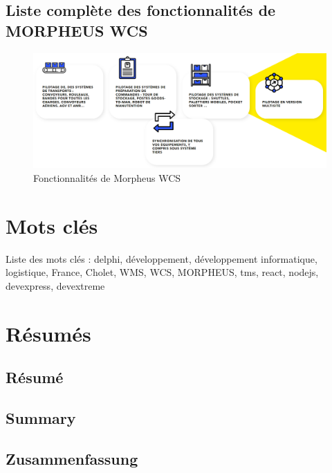 \documentclass[a4paper, 12pt, french]{article}
\begin{document}
		\subsection{Liste complète des fonctionnalités de MORPHEUS WCS}\label{appendix:morpheusWCSFonctionnalites}
			\begin{figure}[h!]
					\includegraphics[width=\linewidth]{images/morpheus_wcs_fonctionnalites.png}
					\caption{Fonctionnalités de Morpheus WCS}%
					\label{fig:morpheus_wcs_fonctionnalites}
			\end{figure}

		\newpage

	\section*{Mots clés}
	Liste des mots clés : delphi, développement, développement informatique, logistique, France, Cholet, WMS, WCS, MORPHEUS, tms, react, nodejs, devexpress, devextreme
	\newpage

	\section*{Résumés}
		\subsection*{Résumé}

		\subsection*{Summary}


		\subsection*{Zusammenfassung}


	
		\newpage
\end{document}
